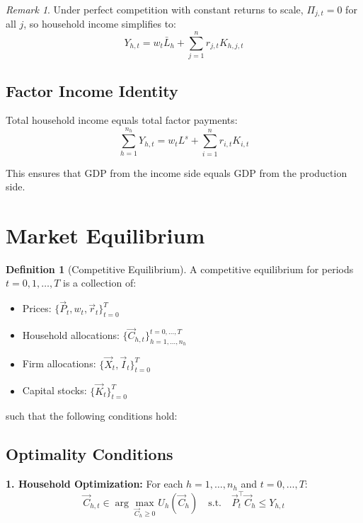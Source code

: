 \documentclass[12pt,a4paper]{article}
\theoremstyle{definition}
\newtheorem{definition}[theorem]{Definition}
\theoremstyle{remark}
\newtheorem{remark}[theorem]{Remark}
\begin{document}
\begin{remark}
Under perfect competition with constant returns to scale, $\Pi_{j,t} = 0$ for all $j$, so household income simplifies to:
\begin{equation}
    Y_{h,t} = w_t \bar{L}_h + \sum_{j=1}^n r_{j,t} K_{h,j,t}
\end{equation}
\end{remark}

\subsection{Factor Income Identity}

Total household income equals total factor payments:
\begin{equation}
    \sum_{h=1}^{n_h} Y_{h,t} = w_t L^s + \sum_{i=1}^n r_{i,t} K_{i,t}
\end{equation}

This ensures that GDP from the income side equals GDP from the production side.

\section{Market Equilibrium}

\begin{definition}[Competitive Equilibrium]
A competitive equilibrium for periods $t = 0, 1, \ldots, T$ is a collection of:
\begin{itemize}
    \item Prices: $\{\vec{P}_t, w_t, \vec{r}_t\}_{t=0}^T$
    \item Household allocations: $\{\vec{C}_{h,t}\}_{h=1,\ldots,n_h}^{t=0,\ldots,T}$
    \item Firm allocations: $\{\vec{X}_t, \vec{I}_t\}_{t=0}^T$
    \item Capital stocks: $\{\vec{K}_t\}_{t=0}^T$
\end{itemize}
such that the following conditions hold:
\end{definition}

\subsection{Optimality Conditions}

\textbf{1. Household Optimization:} For each $h = 1,\ldots,n_h$ and $t = 0,\ldots,T$:
\begin{equation}
    \vec{C}_{h,t} \in \arg\max_{\vec{C}_h \geq 0} U_h(\vec{C}_h) \quad \text{s.t.} \quad \vec{P}_t^\top \vec{C}_h \leq Y_{h,t}
\end{equation}
\end{document}
